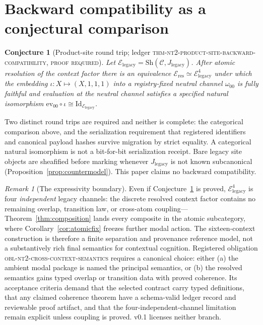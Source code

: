 \documentclass[11pt]{amsart}
\newtheorem{conjecture}[theorem]{Conjecture}
\theoremstyle{definition}
\theoremstyle{remark}
\newtheorem{remark}[theorem]{Remark}
\newcommand{\Sh}{\mathrm{Sh}}
\newcommand{\Jleg}{J_{\mathrm{legacy}}}
\newcommand{\Eres}{\mathcal{E}_{\mathrm{res}}}
\newcommand{\Eleg}{\mathcal{E}_{\mathrm{legacy}}}
\newcommand{\cC}{\mathcal{C}}
\begin{document}
\section{Backward compatibility as a conjectural comparison}\label{sec:compat}

\begin{conjecture}[Product-site round trip; \textnormal{ledger \textsc{thm-nt2-product-site-backward-compatibility}, \textsc{proof required}}]\label{conj:roundtrip}
Let $\Eleg=\Sh(\cC,\Jleg)$. After atomic resolution of the context factor there is an equivalence $\Eres\simeq\Eleg^{4}$ under which the embedding $\iota:X\mapsto(X,1,1,1)$ into a registry-fixed neutral channel $\omega_{00}$ is fully faithful and evaluation at the neutral channel satisfies a specified natural isomorphism $\mathrm{ev}_{00}\circ\iota\cong\mathrm{Id}_{\Eleg}$.
\end{conjecture}

Two distinct round trips are required and neither is complete: the categorical comparison above, and the serialization requirement that registered identifiers and canonical payload hashes survive migration by strict equality. A categorical natural isomorphism is not a bit-for-bit serialization receipt. Bare legacy site objects are sheafified before marking whenever $\Jleg$ is not known subcanonical (Proposition~\ref{prop:countermodel}). This paper claims no backward compatibility.

\begin{remark}[The expressivity boundary]\label{rem:expressivity}
Even if Conjecture~\ref{conj:roundtrip} is proved, $\Eleg^4$ is four \emph{independent} legacy channels: the discrete resolved context factor contains no remaining overlap, transition law, or cross-atom coupling---Theorem~\ref{thm:composition} lands every composite in the atomic subcategory, where Corollary~\ref{cor:atomicfix} freezes further modal action. The sixteen-context construction is therefore a finite separation and provenance reference model, not a substantively rich final semantics for contextual cognition. Registered obligation \textsc{obl-nt2-cross-context-semantics} requires a canonical choice: either (a) the ambient modal package is named the principal semantics, or (b) the resolved semantics gains typed overlap or transition data with proved coherence. Its acceptance criteria demand that the selected contract carry typed definitions, that any claimed coherence theorem have a schema-valid ledger record and reviewable proof artifact, and that the four-independent-channel limitation remain explicit unless coupling is proved. v0.1 licenses neither branch.
\end{remark}
\end{document}
